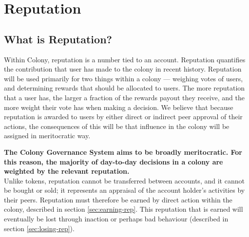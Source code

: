 \section{Reputation}\label{sec:reputation}
\subsection{What is Reputation?}\label{subsec:what-is-reputation}

Within Colony, reputation is a number tied to an account. Reputation quantifies the contribution that user has made to the colony in recent history. Reputation will be used primarily for two things within a colony --- weighing votes of users, and determining rewards that should be allocated to users. The more reputation that a user has, the larger a fraction of the rewards payout they receive, and the more weight their vote has when making a decision. We believe that because reputation is awarded to users by either direct or indirect peer approval of their actions, the consequences of this will be that influence in the colony will be assigned in meritocratic way.

\textbf{The Colony Governance System aims to be broadly meritocratic. For this reason, the majority of day-to-day decisions in a colony are weighted by the relevant reputation.}\\ %

Unlike tokens, reputation cannot be transferred between accounts, and it cannot be bought or sold; it represents an appraisal of the account holder's activities by their peers. Reputation must therefore be earned by direct action within the colony, described in section \ref{sec:earning-rep}. This reputation that is earned will eventually be lost through inaction or perhaps bad behaviour (described in section \ref{sec:losing-rep}). 



